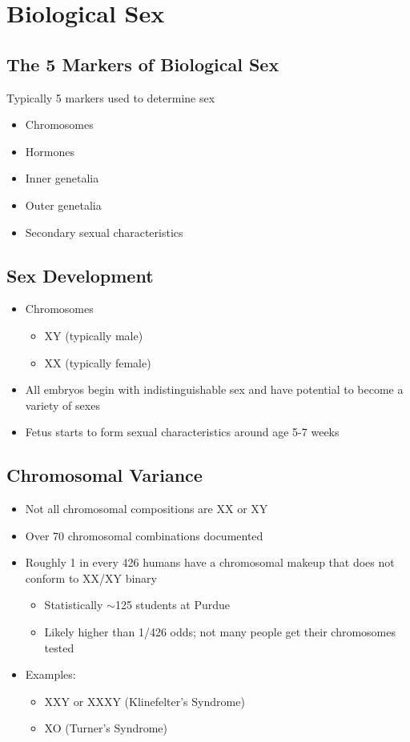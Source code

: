 \documentclass[a4paper]{article}
\begin{document}
\section{Biological Sex} %

\subsection{The 5 Markers of Biological Sex}
Typically 5 markers used to determine sex
\begin{itemize}
  \item Chromosomes
  \item Hormones
  \item Inner genetalia
  \item Outer genetalia
  \item Secondary sexual characteristics
\end{itemize}

\subsection{Sex Development}
\begin{itemize}
  \item Chromosomes \begin{itemize}
    \item XY (typically male)
    \item XX (typically female)
  \end{itemize}
  \item All embryos begin with indistinguishable sex and have potential to become a variety of sexes
  \item Fetus starts to form sexual characteristics around age 5-7 weeks
\end{itemize}

\subsection{Chromosomal Variance}
\begin{itemize}
  \item Not all chromosomal compositions are XX or XY
  \item Over 70 chromosomal combinations documented
  \item Roughly 1 in every 426 humans have a chromosomal makeup that does not conform to XX/XY binary \begin{itemize}
    \item Statistically $ \sim $125 students at Purdue
    \item Likely higher than 1/426 odds; not many people get their chromosomes tested
  \end{itemize}
  \item Examples: \begin{itemize}
    \item XXY or XXXY (Klinefelter's Syndrome)
    \item XO (Turner's Syndrome)
  \end{itemize}
\end{itemize}
\end{document}
